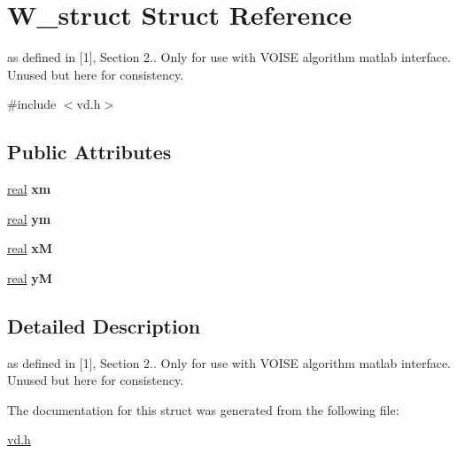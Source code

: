 \hypertarget{structW__struct}{}\section{W\+\_\+struct Struct Reference}
\label{structW__struct}


as defined in \mbox{[}1\mbox{]}, Section 2.. Only for use with V\+O\+I\+SE algorithm matlab interface. Unused but here for consistency.  




{\ttfamily \#include $<$vd.\+h$>$}

\subsection*{Public Attributes}
\begin{DoxyCompactItemize}
\item 
\mbox{\label{structW__struct_a7c0ed763a5701a0787361a68cad4aec4}} 
\mbox{\hyperlink{typedefs_8cpp_a58a0c7cf2501f4492da833421be92547}{real}} {\bfseries xm}
\item 
\mbox{\label{structW__struct_a69290893bf3fc1a9bf0ff987a9e25320}} 
\mbox{\hyperlink{typedefs_8cpp_a58a0c7cf2501f4492da833421be92547}{real}} {\bfseries ym}
\item 
\mbox{\label{structW__struct_a20e12df215aaa6a737a15b05e6102093}} 
\mbox{\hyperlink{typedefs_8cpp_a58a0c7cf2501f4492da833421be92547}{real}} {\bfseries xM}
\item 
\mbox{\label{structW__struct_a10de004bf31c6563ad0a55116a96cd8d}} 
\mbox{\hyperlink{typedefs_8cpp_a58a0c7cf2501f4492da833421be92547}{real}} {\bfseries yM}
\end{DoxyCompactItemize}


\subsection{Detailed Description}
as defined in \mbox{[}1\mbox{]}, Section 2.. Only for use with V\+O\+I\+SE algorithm matlab interface. Unused but here for consistency. 

The documentation for this struct was generated from the following file\+:\begin{DoxyCompactItemize}
\item 
\mbox{\hyperlink{vd_8h}{vd.\+h}}\end{DoxyCompactItemize}
